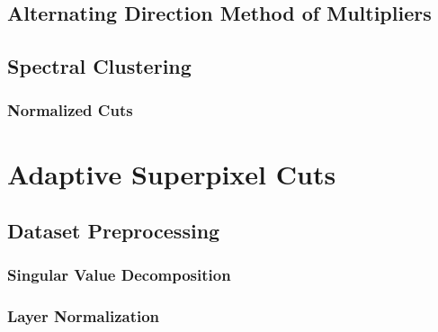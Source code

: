 \documentclass[10pt]{article}
\begin{document}
\subsection{Alternating Direction Method of Multipliers}\label{ADMM Intro}

%  

\subsection{Spectral Clustering} \label{Spectral Clustering}

\subsubsection{Normalized Cuts} \label{Normalized Cuts}


\clearpage
% 
% 
% 
% 
% 
\section{Adaptive Superpixel Cuts} \label{Algorithm Intro}


\clearpage
\subsection{Dataset Preprocessing} \label{Algorithm Preprocessing}

\subsubsection{Singular Value Decomposition} \label{SVD}

\subsubsection{Layer Normalization} \label{Normalization}

\end{document}
